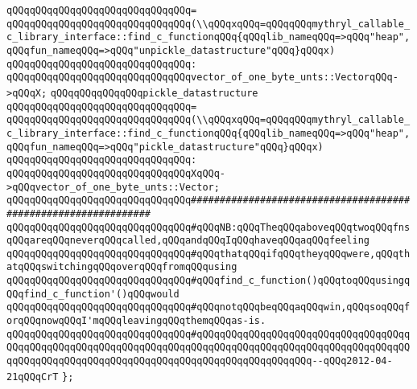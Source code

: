 \verb|qQQqqQQqqQQqqQQqqQQqqQQqqQQqqQQq=|\newline
\verb|qQQqqQQqqQQqqQQqqQQqqQQqqQQqqQQq(\\qQQqxqQQq=qQQqqQQqmythryl_callable_c_library_interface::find_c_functionqQQq{qQQqlib_nameqQQq=>qQQq"heap",qQQqfun_nameqQQq=>qQQq"unpickle_datastructure"qQQq}qQQqx)|\newline
\verb|qQQqqQQqqQQqqQQqqQQqqQQqqQQqqQQq:|\newline
\verb|qQQqqQQqqQQqqQQqqQQqqQQqqQQqqQQqvector_of_one_byte_unts::VectorqQQq->qQQqX;|\newline
\newline
\verb|qQQqqQQqqQQqqQQqpickle_datastructure|\newline
\verb|qQQqqQQqqQQqqQQqqQQqqQQqqQQqqQQq=|\newline
\verb|qQQqqQQqqQQqqQQqqQQqqQQqqQQqqQQq(\\qQQqxqQQq=qQQqqQQqmythryl_callable_c_library_interface::find_c_functionqQQq{qQQqlib_nameqQQq=>qQQq"heap",qQQqfun_nameqQQq=>qQQq"pickle_datastructure"qQQq}qQQqx)|\newline
\verb|qQQqqQQqqQQqqQQqqQQqqQQqqQQqqQQq:|\newline
\verb|qQQqqQQqqQQqqQQqqQQqqQQqqQQqqQQqXqQQq->qQQqvector_of_one_byte_unts::Vector;|\newline
\newline
\verb|qQQqqQQqqQQqqQQqqQQqqQQqqQQqqQQq###############################################################|\newline
\verb|qQQqqQQqqQQqqQQqqQQqqQQqqQQqqQQq#qQQqNB:qQQqTheqQQqaboveqQQqtwoqQQqfnsqQQqareqQQqneverqQQqcalled,qQQqandqQQqIqQQqhaveqQQqaqQQqfeeling|\newline
\verb|qQQqqQQqqQQqqQQqqQQqqQQqqQQqqQQq#qQQqthatqQQqifqQQqtheyqQQqwere,qQQqthatqQQqswitchingqQQqoverqQQqfromqQQqusing|\newline
\verb|qQQqqQQqqQQqqQQqqQQqqQQqqQQqqQQq#qQQqfind_c_function()qQQqtoqQQqusingqQQqfind_c_function'()qQQqwould|\newline
\verb|qQQqqQQqqQQqqQQqqQQqqQQqqQQqqQQq#qQQqnotqQQqbeqQQqaqQQqwin,qQQqsoqQQqforqQQqnowqQQqI'mqQQqleavingqQQqthemqQQqas-is.|\newline
\verb|qQQqqQQqqQQqqQQqqQQqqQQqqQQqqQQq#qQQqqQQqqQQqqQQqqQQqqQQqqQQqqQQqqQQqqQQqqQQqqQQqqQQqqQQqqQQqqQQqqQQqqQQqqQQqqQQqqQQqqQQqqQQqqQQqqQQqqQQqqQQqqQQqqQQqqQQqqQQqqQQqqQQqqQQqqQQqqQQqqQQqqQQqqQQqqQQq--qQQq2012-04-21qQQqCrT|\newline
\verb|};|\newline
\newline
\newline
\newline


